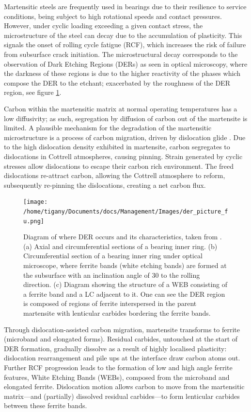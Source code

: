\documentclass[a4paper,11pt]{article}
\begin{document}
Martensitic steels are frequently used in bearings due to their resilience to service conditions,
being subject to high rotational speeds and contact pressures. However, under cyclic loading
exceeding a given contact stress, the microstructure of the steel can decay due to the accumulation
of plasticity. This signals the onset of rolling cycle fatigue (RCF), which increases the risk of
failure from subsurface crack initiation. The microstructural decay corresponds to the observation
of Dark Etching Regions (DERs) as seen in optical microscopy, where the darkness of these regions is due
to the higher reactivity of the phases which compose the DER to the etchant; exacerbated by
the roughness of the DER region, see figure \ref{fuderpicture}.

Carbon within the martensitic matrix at normal operating temperatures has a low diffusivity; as
such, segregation by diffusion of carbon out of the martensite is limited. A plausible mechanism
for the degradation of the martensitic microstructure is a process of carbon migration, driven by
dislocation glide
\cite{Fu2017,fu17_strain_induc_marten_decay_bearin,Warhadpande1_2013,Warhadpande2013,voskamp97_state_resid_stres_induc_by,Swahn1976}. Due
to the high dislocation density exhibited in martensite, carbon segregates to dislocations in
Cottrell atmospheres, causing pinning. Strain generated by cyclic stresses allow dislocations to
escape their carbon rich environment. The freed dislocations re-attract carbon, allowing the
Cottrell atmosphere to reform, subsequently re-pinning the dislocations, creating a net carbon
flux.


\begin{figure}[htbp]
\centering
\texttt{[image: /home/tigany/Documents/docs/Management/Images/der\_picture\_fu.png]}
\caption{Diagram of where DER occurs and its characteristics, taken from \cite{Fu2017}. (a) Axial and circumferential sections of a bearing inner ring. (b) Circumferential section of a bearing inner ring under optical microscope, where ferrite bands (white etching bands) are formed at the subsurface with an inclination angle of 30\textdegree{} to the rolling direction. (c) Diagram showing the structure of a WEB consisting of a ferrite band and a LC adjacent to it. One can see the DER region is composed of regions of ferrite interspersed in the parent martensite with lenticular carbides bordering the ferrite bands. \label{fuderpicture}}
\end{figure}

Through dislocation-assisted carbon migration, martensite transforms to ferrite (microband and
elongated forms). Residual carbides, untouched at the start of DER formation, gradually dissolve
as a result of highly localised plasticity: dislocation rearrangement and pile ups at the
interface draw carbon atoms out. Further RCF progression leads to the formation of low and high
angle ferrite features, White Etching Bands (WEBs), composed from the microband and elongated
ferrite. Dislocation motion allows carbon to move from the martensitic
matrix---and (partially) dissolved residual carbides---to form lenticular carbides between these
ferrite bands. 
\end{document}

